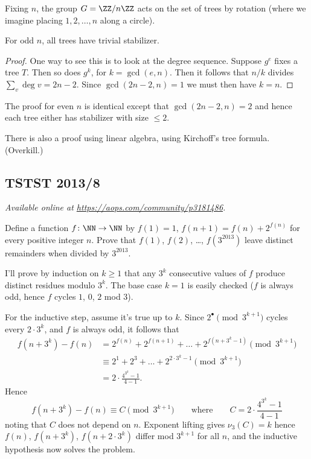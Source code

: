 \documentclass[11pt]{scrartcl}
\begin{document}
Fixing $n$, the group $G = \ZZ/n\ZZ$ acts on the set of trees
by rotation (where we imagine placing $1,2,\dots,n$ along a circle).

\begin{claim*}
  For odd $n$, all trees have trivial stabilizer.
\end{claim*}
\begin{proof}
  One way to see this is to look at the degree sequence.
  Suppose $g^e$ fixes a tree $T$.
  Then so does $g^k$, for $k = \gcd(e,n)$.
  Then it follows that $n/k$ divides $\sum_v \deg v = 2n-2$.
  Since $\gcd(2n-2, n) = 1$ we must then have $k = n$.
\end{proof}

The proof for even $n$ is identical except that $\gcd(2n-2, n) = 2$
and hence each tree either has stabilizer with size $\le 2$.

There is also a proof using linear algebra,
using Kirchoff's tree formula.  (Overkill.)
\pagebreak

\subsection{TSTST 2013/8}
\textsl{Available online at \url{https://aops.com/community/p3181486}.}
\begin{mdframed}[style=mdpurplebox,frametitle={Problem statement}]
Define a function $f \colon \NN \to \NN$ by $f(1) = 1$,
$f(n+1) = f(n) + 2^{f(n)}$ for every positive integer $n$.
Prove that $f(1)$, $f(2)$, \dots, $f(3^{2013})$
leave distinct remainders when divided by $3^{2013}$.
\end{mdframed}
I'll prove by induction on $k \ge 1$ that any $3^k$
consecutive values of $f$ produce distinct residues modulo $3^k$.
The base case $k=1$ is easily checked
($f$ is always odd, hence $f$ cycles $1$, $0$, $2$ mod $3$).

For the inductive step, assume it's true up to $k$.
Since $2^\bullet \pmod{3^{k+1}}$ cycles every $2 \cdot 3^k$,
and $f$ is always odd, it follows that
\begin{align*}
  f(n+3^k) - f(n)
  &= 2^{f(n)} + 2^{f(n+1)} + \dots + 2^{f(n+3^k-1)} \pmod{3^{k+1}} \\
  &\equiv 2^1 + 2^3 + \dots + 2^{2 \cdot 3^k-1} \pmod{3^{k+1}} \\
  &= 2 \cdot \frac{4^{3^k}-1}{4-1}.
\end{align*}
Hence
\[
  f(n+3^k)-f(n) \equiv C \pmod{3^{k+1}}
  \qquad\text{where} \qquad C = 2 \cdot \frac{4^{3^k}-1}{4-1}
\]
noting that $C$ does not depend on $n$. Exponent lifting gives $\nu_3(C) = k$
hence $f(n)$, $f(n+3^k)$, $f(n+2\cdot3^k)$ differ mod $3^{k+1}$ for all $n$,
and the inductive hypothesis now solves the problem.
\pagebreak
\end{document}
